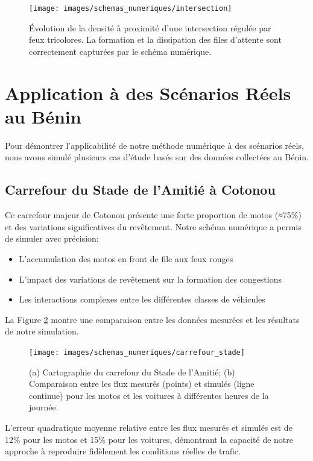 \begin{figure}[htbp]
\centering
\texttt{[image: images/schemas\_numeriques/intersection]}
\caption{Évolution de la densité à proximité d'une intersection régulée par feux tricolores. La formation et la dissipation des files d'attente sont correctement capturées par le schéma numérique.}
\label{fig:intersection}
\end{figure}

\section{Application à des Scénarios Réels au Bénin}
\label{sec:application_benin}

Pour démontrer l'applicabilité de notre méthode numérique à des scénarios réels, nous avons simulé plusieurs cas d'étude basés sur des données collectées au Bénin.

\subsection{Carrefour du Stade de l'Amitié à Cotonou}
\label{subsec:carrefour_stade}

Ce carrefour majeur de Cotonou présente une forte proportion de motos (≈75\%) et des variations significatives du revêtement. Notre schéma numérique a permis de simuler avec précision:

\begin{itemize}
\item L'accumulation des motos en front de file aux feux rouges
\item L'impact des variations de revêtement sur la formation des congestions
\item Les interactions complexes entre les différentes classes de véhicules
\end{itemize}

La Figure \ref{fig:carrefour_stade} montre une comparaison entre les données mesurées et les résultats de notre simulation.

\begin{figure}[htbp]
\centering
\texttt{[image: images/schemas\_numeriques/carrefour\_stade]}
\caption{(a) Cartographie du carrefour du Stade de l'Amitié; (b) Comparaison entre les flux mesurés (points) et simulés (ligne continue) pour les motos et les voitures à différentes heures de la journée.}
\label{fig:carrefour_stade}
\end{figure}

L'erreur quadratique moyenne relative entre les flux mesurés et simulés est de 12\% pour les motos et 15\% pour les voitures, démontrant la capacité de notre approche à reproduire fidèlement les conditions réelles de trafic.

